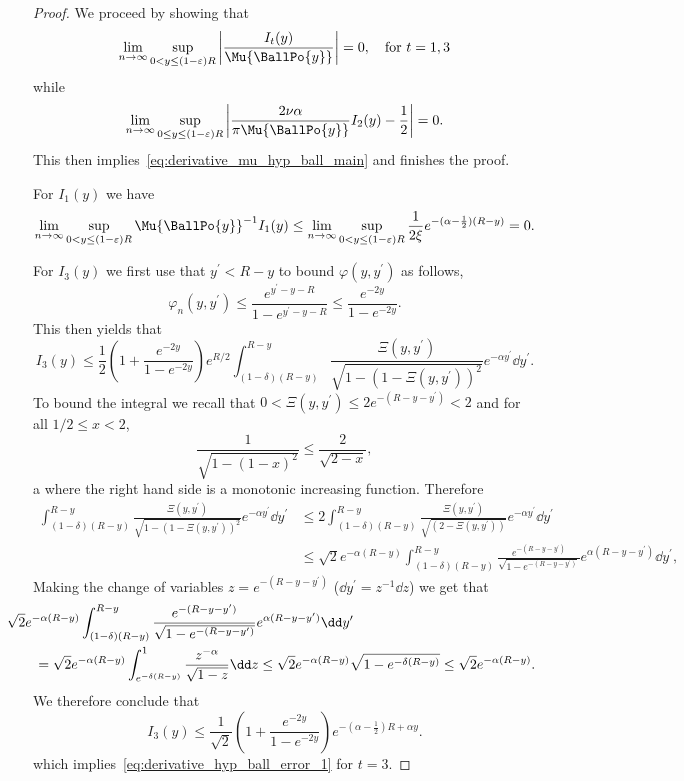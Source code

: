 \begin{proof}
We proceed by showing that
\begin{equation}\label{eq:derivative_hyp_ball_error_1}
	\lim_{n \to \infty} \sup_{0 < y \le (1-\varepsilon)R} \left|\frac{I_t(y)}{\Mu{\BallPo{y}}}\right| 
	= 0, \quad \text{for } t = 1,3
\end{equation}
while
\begin{equation}\label{eq:derivative_hyp_ball_main_part}
	\lim_{n \to \infty} \sup_{0 \le y \le (1-\varepsilon)R} \left|\frac{2\nu \alpha}{\pi \Mu{\BallPo{y}}} I_2(y) - \frac{1}{2}\right| = 0.
\end{equation}
This then implies~\eqref{eq:derivative_mu_hyp_ball_main} and finishes the proof.

For $I_1(y)$ we have 
\[
	\lim_{n \to \infty} \sup_{0 < y \le (1-\varepsilon)R} \Mu{\BallPo{y}}^{-1} I_1(y) 
	\le \lim_{n \to \infty} \sup_{0 < y \le (1-\varepsilon)R} \frac{1}{2\xi} e^{-(\alpha - \frac{1}{2})(R - y)} = 0.
\]

For $I_3(y)$ we first use that $y^\prime < R - y$ to bound $\varphi(y,y^\prime)$ as follows,
\[
	\varphi_n(y,y^\prime) \le \frac{e^{y^\prime - y - R}}{1 - e^{y^\prime - y - R}} \le \frac{e^{-2y}}{1 - e^{-2y}}.
\]
This then yields that
\[
	I_3(y) \le \frac{1}{2}\left(1 + \frac{e^{-2y}}{1 - e^{-2y}}\right)e^{R/2}
	\int_{(1-\delta)(R- y)}^{R - y} \frac{ \Xi(y,y^\prime)}{\sqrt{1 - \left(1 - \Xi(y,y^\prime)\right)^2}}
	e^{-\alpha y^\prime} \dd y^\prime.
\]
To bound the integral we recall that $0 < \Xi(y,y^\prime) \le 2e^{-(R-y-y^\prime)} < 2$ and for all $1/2 \le x < 2$,
\[
	\frac{1}{\sqrt{1- (1-x)^2}} \le \frac{2}{\sqrt{2-x}},
\]a
where the right hand side is a monotonic increasing function.
Therefore
\begin{align*}
	\int_{(1-\delta)(R- y)}^{R - y} \frac{ \Xi(y,y^\prime)}{\sqrt{1 - \left(1 - \Xi(y,y^\prime)\right)^2}}
		e^{-\alpha y^\prime} \dd y^\prime
	&\le 2 \int_{(1-\delta)(R- y)}^{R - y} \frac{\Xi(y,y^\prime)}{\sqrt{(2-\Xi(y,y^\prime))}} e^{-\alpha y^\prime} 
		\dd y^\prime \\
	&\le \sqrt{2} e^{-\alpha(R - y)} \int_{(1-\delta)(R- y)}^{R - y} 
		\frac{e^{-(R - y - y^\prime)}}{\sqrt{1 - e^{-(R - y - y^\prime)}}} e^{\alpha (R - y - y^\prime)} \dd y^\prime,
\end{align*}
Making the change of variables $z = e^{-(R - y - y^\prime)}$ ($\dd y^\prime = z^{-1} \dd z$) we get that
\begin{align*}
	&\hspace{-20pt}\sqrt{2} e^{-\alpha(R - y)} \int_{(1-\delta)(R- y)}^{R - y} 
			\frac{e^{-(R - y - y^\prime)}}{\sqrt{1 - e^{-(R - y - y^\prime)}}} e^{\alpha (R - y - y^\prime)} \dd y^\prime\\
	&= \sqrt{2} e^{-\alpha(R - y)} \int_{e^{-\delta (R - y)}}^{1} \frac{z^{-\alpha}}{\sqrt{1 - z}} \dd z
		\le \sqrt{2} e^{-\alpha(R - y)} \sqrt{1 - e^{-\delta (R - y)}}
		\le \sqrt{2} e^{-\alpha (R -y)}.
\end{align*}
We therefore conclude that
\[
	I_3(y) \le \frac{1}{\sqrt{2}} \left(1 + \frac{e^{-2y}}{1 - e^{-2y}}\right)e^{-(\alpha -\frac{1}{2})R + \alpha y}.
\]
which implies~\eqref{eq:derivative_hyp_ball_error_1} for $t=3$.


\end{proof}

